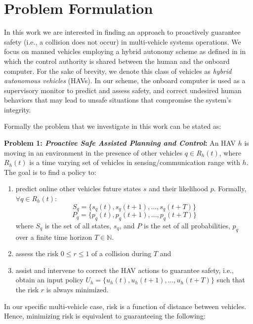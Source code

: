 \documentclass[letterpaper, 10 pt, conference]{ieeeconf}  %
\newcommand{\N}{\mathbb {N}}
\begin{document}
    
\section{Problem Formulation} \label{sec:probform}
 
In this work we are interested in finding an approach to proactively guarantee safety (i.e., a collision does not occur) in multi-vehicle systems operations. We focus on manned vehicles employing a hybrid autonomy scheme as defined in \cite{corke} in which the control authority is shared between the human and the onboard computer. For the sake of brevity, we denote this class of vehicles as {\em hybrid autonomous vehicles} (HAVs). In our scheme, the onboard computer is used as a supervisory monitor to predict and assess safety, and correct undesired human behaviors that may lead to unsafe situations that compromise the system's integrity. 

Formally the problem that we investigate in this work can be stated as: 

\textbf{Problem 1: \textit{Proactive Safe Assisted Planning and Control}:} 
      An HAV $h$ is moving in an environment in the presence of other vehicles $q \in R_h(t)$, where $R_h(t)$ is a time varying set of vehicles in sensing/communication range with $h$. The goal is to find a policy to:
    \begin{enumerate}
        \item  predict online other vehicles future states $s$ and their likelihood $p$. Formally, $\forall q \in R_h(t)$:
    \begin{equation}
   S_q=\{{s_q(t), s_q(t+1),..., s_q(t+T)}\}
       \end{equation}
       \begin{equation}
   P_q=\{{p_q(t), p_q(t+1),..., p_q(t+T)}\}
    \end{equation}
     where $S_q$ is the set of all states, $s_q$, and $P$ is the set of all probabilities, $p_q$ over a finite time horizon $T\in\N$.  
    \item assess the risk $0\leq r \leq1$ of a collision during $T$ and
    \item assist and intervene to correct the HAV actions to guarantee safety, i.e., obtain an input policy $U_h=\{{u_h(t), u_h(t+1),..., u_h(t+T)}\}$ such that the risk $r$ is always minimized. 
    \end{enumerate}
   In our specific multi-vehicle case, risk is a function of distance between vehicles. Hence, minimizing risk is equivalent to guaranteeing the following:
\end{document}
